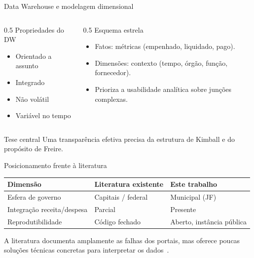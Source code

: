 \documentclass[aspectratio=169]{beamer}
\begin{document}
\begin{frame}{Data Warehouse e modelagem dimensional~\citep{kimball2013data}}
  \begin{columns}[T]
    \begin{column}{0.5\textwidth}
      Propriedades do DW
      \begin{itemize}\small
        \item Orientado a assunto
        \item Integrado
        \item Não volátil
        \item Variável no tempo
      \end{itemize}
    \end{column}
    \begin{column}{0.5\textwidth}
      Esquema estrela
      \begin{itemize}\small
        \item Fatos: métricas (empenhado, liquidado, pago).
        \item Dimensões: contexto (tempo, órgão, função, fornecedor).
        \item Prioriza a usabilidade analítica sobre junções complexas.
      \end{itemize}
    \end{column}
  \end{columns}
  \vspace{0.2cm}
  \begin{block}{Tese central}
    Uma transparência efetiva precisa da estrutura de Kimball e do propósito de Freire.
  \end{block}
\end{frame}

\begin{frame}{Posicionamento frente à literatura}
  \small
  \begin{table}
    \centering
    \begin{tabular}{@{}p{3.4cm}p{3.6cm}p{3.6cm}@{}}
      \toprule
      \textbf{Dimensão} & \textbf{Literatura existente} & \textbf{Este trabalho} \\
      \midrule
      Esfera de governo & Capitais / federal & Municipal (JF) \\
      Integração receita/despesa & Parcial & Presente \\
      Reprodutibilidade & Código fechado & Aberto, instância pública \\
      \bottomrule
    \end{tabular}
  \end{table}
  \vspace{0.1cm}
  \footnotesize A literatura documenta amplamente as falhas dos portais, mas oferece poucas soluções técnicas concretas para interpretar os dados~\citep{melo2019proposta,teles2024panorama}.
\end{frame}
\end{document}
